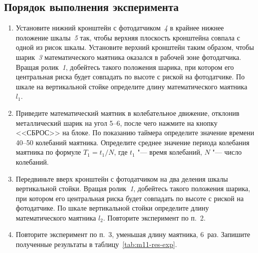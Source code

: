 \documentclass[a4paper, 12pt]{extarticle}
\begin{document}
\subsection{Порядок выполнения эксперимента}
\begin{enumerate}
\item Установите нижний кронштейн с фотодатчиком~\emph{4} в крайнее нижнее положение шкалы~\emph{5} так, чтобы верхняя плоскость кронштейна совпала с одной из рисок шкалы. Установите верхний кронштейн таким образом, чтобы шарик~\emph{3} математического маятника оказался в рабочей зоне фотодатчика. Вращая  ролик~\emph{1}, добейтесь такого положения шарика, при котором его центральная риска будет совпадать по высоте с риской на     фотодатчике. По шкале на вертикальной стойке определите длину математического маятника~$l_1$.
\item Приведите математический маятник в колебательное движение, отклонив металлический шарик на угол 5--6\degree, после чего нажмите на кнопку <<СБРОС>> на блоке. По показанию таймера определите значение времени 40--50 колебаний маятника. Определите среднее значение периода колебания маятника по формуле $T_1 = t_1 / N$, где $t_1$ "--- время колебаний, $N$ "--- число колебаний. %
\item Передвиньте вверх кронштейн с фотодатчиком на два деления шкалы вертикальной стойки. Вращая ролик~\emph{1}, добейтесь такого положения шарика, при котором его центральная риска будет совпадать по высоте с риской  на фотодатчике. По шкале вертикальной стойки определите длину математического маятника $l_2$. Повторите эксперимент по п.~2.
\item Повторите эксперимент по п.~3, уменьшая длину маятника, 6~раз. Запишите  полученные результаты в таблицу~\ref{tab:m11-res-exp}. %


\end{enumerate}
\end{document}

